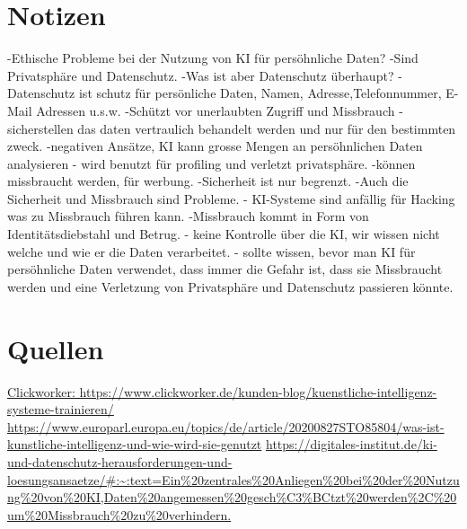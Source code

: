\documentclass{article}
\begin{document}
\section{Notizen}
-Ethische Probleme bei der Nutzung von KI für persöhnliche Daten? -Sind Privatsphäre und Datenschutz. -Was ist aber Datenschutz überhaupt? -Datenschutz ist schutz für persönliche Daten, Namen, Adresse,Telefonnummer, E-Mail Adressen u.s.w. -Schützt vor unerlaubten Zugriff und Missbrauch -sicherstellen das daten vertraulich behandelt werden und nur für den bestimmten zweck.  -negativen Ansätze, KI kann grosse Mengen an persöhnlichen Daten analysieren - wird benutzt für profiling und verletzt privatsphäre. -können missbraucht werden, für werbung. -Sicherheit ist nur begrenzt.
-Auch die Sicherheit und Missbrauch sind Probleme. - KI-Systeme sind anfällig für Hacking was zu Missbrauch führen kann. -Missbrauch kommt in Form von Identitätsdiebstahl und Betrug.
- keine Kontrolle über die KI, wir wissen nicht welche und wie er die Daten verarbeitet.
- sollte wissen, bevor man KI für persöhnliche Daten verwendet, dass immer die Gefahr ist, dass sie Missbraucht werden und eine Verletzung von Privatsphäre und Datenschutz passieren könnte. 


\section{Quellen}
\url {Clickworker: https://www.clickworker.de/kunden-blog/kuenstliche-intelligenz-systeme-trainieren/}
\url {https://www.europarl.europa.eu/topics/de/article/20200827STO85804/was-ist-kunstliche-intelligenz-und-wie-wird-sie-genutzt}
\url{https://digitales-institut.de/ki-und-datenschutz-herausforderungen-und-loesungsansaetze/#:~:text=Ein%20zentrales%20Anliegen%20bei%20der%20Nutzung%20von%20KI,Daten%20angemessen%20gesch%C3%BCtzt%20werden%2C%20um%20Missbrauch%20zu%20verhindern.}
\end{document}
